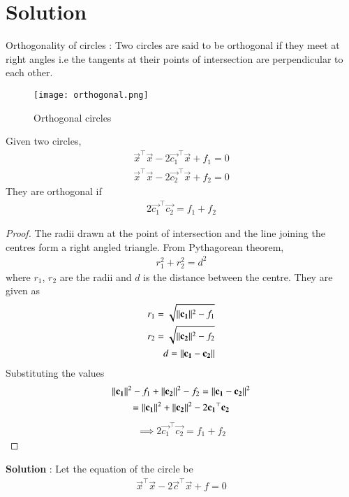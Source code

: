 \documentclass[journal,12pt,twocolumn]{IEEEtran}
\begin{document}
\section{Solution}
\begin{lemma}
Orthogonality of circles : Two circles are said to be orthogonal if they meet at right angles i.e the tangents at their points of intersection are perpendicular to each other.
\begin{figure}[h!]
\centering
\texttt{[image: orthogonal.png]}
\label{fig:orthogonality1}
\caption{Orthogonal circles}
\end{figure}
Given two circles,
\begin{align}
    \vec{x}^\top\vec{x} - 2\vec{c_1}^\top\vec{x} + f_1 = 0\\
    \vec{x}^\top\vec{x} - 2\vec{c_2}^\top\vec{x} + f_2 = 0
\end{align}
They are orthogonal if
\begin{align}
    2\vec{c_1}^\top\vec{c_2} = f_1 + f_2 \label{condition}
\end{align}
\end{lemma}
\begin{proof}
The radii drawn at the point of intersection and the line joining the centres form a right angled triangle. From Pythagorean theorem,
\begin{align}
    r_1^2 + r_2^2 = d^2
\end{align}
where $r_1$, $r_2$ are the radii and $d$ is the distance between the centre. They are given as
\begin{align}
    r_1 = \sqrt{\lVert\mathbf{c_1}\rVert^2 - f_1}\\
    r_2 = \sqrt{\lVert\mathbf{c_2}\rVert^2 - f_2}\\
    d = \lVert\mathbf{c_1} - \mathbf{c_2}\rVert
\end{align}
Substituting the values
\begin{multline}
    \lVert\mathbf{c_1}\rVert^2 - f_1 + \lVert\mathbf{c_2}\rVert^2 - f_2 = \lVert\mathbf{c_1} - \mathbf{c_2}\rVert^2\\
    = \lVert\mathbf{c_1}\rVert^2 + \lVert\mathbf{c_2}\rVert^2 - 2\mathbf{c_1}^\top\mathbf{c_2}
\end{multline}
\begin{align}
    \implies 2\vec{c_1}^\top\vec{c_2} = f_1 + f_2
\end{align}
\end{proof}
\textbf{Solution} : Let the equation of the circle be
\begin{align}
    \vec{x}^\top\vec{x} - 2\vec{c}^\top\vec{x} + f = 0
\end{align}
\end{document}
